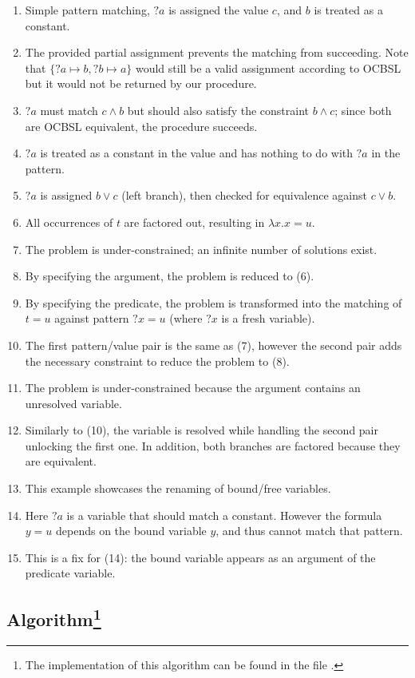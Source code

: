 \begin{enumerate}
\itemsep-0.1cm
\item Simple pattern matching, ${?a}$ is assigned the value $c$, and $b$ is treated as a constant.
\item The provided partial assignment prevents the matching from succeeding. Note that $\{ ?a \mapsto b, ?b \mapsto a \}$ would still be a valid assignment according to OCBSL but it would not be returned by our procedure.
\item ${?a}$ must match $c \land b$ but should also satisfy the constraint $b \land c$; since both are OCBSL equivalent, the procedure succeeds.
\item ${?a}$ is treated as a constant in the value and has nothing to do with ${?a}$ in the pattern.
\item ${?a}$ is assigned $b \lor c$ (left branch), then checked for equivalence against $c \lor b$.
\item All occurrences of $t$ are factored out, resulting in $\lambda x. x = u$.
\item The problem is under-constrained; an infinite number of solutions exist.
\item By specifying the argument, the problem is reduced to (6).
\item By specifying the predicate, the problem is transformed into the matching of $t = u$ against pattern ${?x} = u$ (where ${?x}$ is a fresh variable).
\item The first pattern/value pair is the same as (7), however the second pair adds the necessary constraint to reduce the problem to (8).
\item The problem is under-constrained because the argument contains an unresolved variable.
\item Similarly to (10), the variable is resolved while handling the second pair unlocking the first one. In addition, both branches are factored because they are equivalent.
\item This example showcases the renaming of bound/free variables.
\item Here ${?a}$ is a variable that should match a constant. However the formula $y = u$ depends on the bound variable $y$, and thus cannot match that pattern.
\item This is a fix for (14): the bound variable appears as an argument of the predicate variable.
\end{enumerate}

\subsection{Algorithm\texorpdfstring{\footnote{The implementation of this algorithm can be found in the file \href{https://github.com/FlorianCassayre/master-project/blob/master/src/main/scala/me/cassayre/florian/masterproject/front/proof/unification/UnificationUtils.scala}{}.}}{Lg}}

